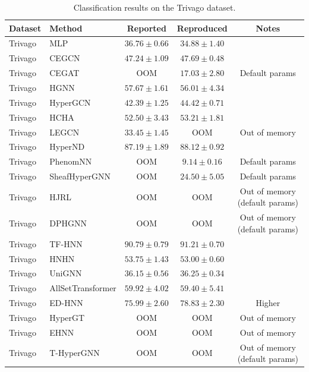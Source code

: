 \vspace{3em}

\begin{table}[H]
    \centering \small
    \renewcommand{\arraystretch}{1.12} 
    \begin{tabular}{llccc}
        \toprule
        Dataset & Method & Reported & Reproduced & Notes \\
        \midrule
        Trivago & MLP & \(36.76 \pm 0.66\) & \(34.88 \pm 1.40\) & \\
        Trivago & CEGCN & \(47.24 \pm 1.09\) & \(47.69 \pm 0.48\) & \\
        Trivago & CEGAT & OOM & \(17.03 \pm 2.80\) & Default params \\
        \grprule
        Trivago & HGNN & \(57.67 \pm 1.61\) & \(56.01 \pm 4.34\) & \\
        Trivago & HyperGCN & \(42.39 \pm 1.25\) & \(44.42 \pm 0.71\) & \\
        Trivago & HCHA & \(52.50 \pm 3.43\) & \(53.21 \pm 1.81\) & \\
        Trivago & LEGCN & \(33.45 \pm 1.45\) & OOM & Out of memory \\
        Trivago & HyperND & \(87.19 \pm 1.89\) & \(88.12 \pm 0.92\) & \\
        Trivago & PhenomNN & OOM & \(9.14 \pm 0.16\) & Default params \\
        Trivago & SheafHyperGNN & OOM & \(24.50 \pm 5.05\) & Default params \\
        Trivago & HJRL & OOM & OOM & Out of memory (default params) \\
        Trivago & DPHGNN & OOM & OOM & Out of memory (default params) \\
        Trivago & TF-HNN & \(90.79 \pm 0.79\) & \(91.21 \pm 0.70\) & \\
        \grprule
        Trivago & HNHN & \(53.75 \pm 1.43\) & \(53.00 \pm 0.60\) & \\
        Trivago & UniGNN & \(36.15 \pm 0.56\) & \(36.25 \pm 0.34\) & \\
        Trivago & AllSetTransformer & \(59.92 \pm 4.02\) & \(59.40 \pm 5.41\) & \\
        Trivago & ED-HNN & \(75.99 \pm 2.60\) & \(78.83 \pm 2.30\) & Higher \\
        Trivago & HyperGT & OOM & OOM & Out of memory \\
        \grprule
        Trivago & EHNN & OOM & OOM & Out of memory \\
        Trivago & T-HyperGNN & OOM & OOM & Out of memory (default params) \\
        \bottomrule
    \end{tabular}
    \caption{Classification results on the Trivago dataset.}
\end{table}

